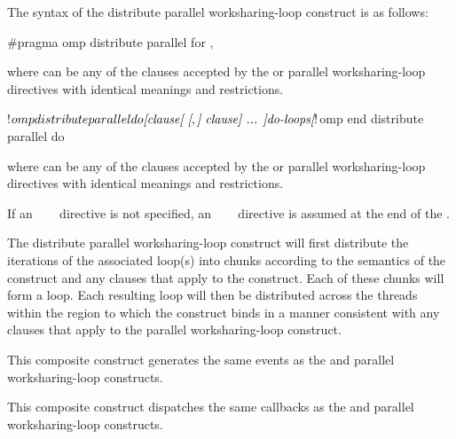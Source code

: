 \syntax
The syntax of the distribute parallel worksharing-loop construct is as follows:

\begin{ccppspecific}
\begin{ompcPragma}
#pragma omp distribute parallel for \plc{[clause[ [},\plc{] clause] ... ] newline}
\end{ompcPragma}

where  can be any of the clauses accepted by the 
or parallel worksharing-loop directives with identical meanings and restrictions.
\end{ccppspecific}

\begin{fortranspecific}
\begin{ompfPragma}
!$omp distribute parallel do \plc{[clause[ [},\plc{] clause] ... ]}
    \plc{do-loops}
\plc{[}!$omp end distribute parallel do\plc{]}
\end{ompfPragma}

where  can be any of the clauses accepted by the  or 
parallel worksharing-loop directives with identical meanings and restrictions.

If an ~~~ directive is not specified, an
~~~ directive is assumed at the end of the .
\end{fortranspecific}

\descr
The distribute parallel worksharing-loop construct will first distribute the
iterations of the associated loop(s) into chunks according to the semantics of
the  construct and any clauses that apply to the
 construct. Each of these chunks will form a loop. Each
resulting loop will then be distributed across the threads within the
 region to which the  construct binds in a manner 
consistent with any clauses that apply to the parallel worksharing-loop construct.

\events

This composite construct generates the same events as the  and parallel worksharing-loop constructs.

\tools

This composite construct dispatches the same callbacks as the  and parallel worksharing-loop constructs.



